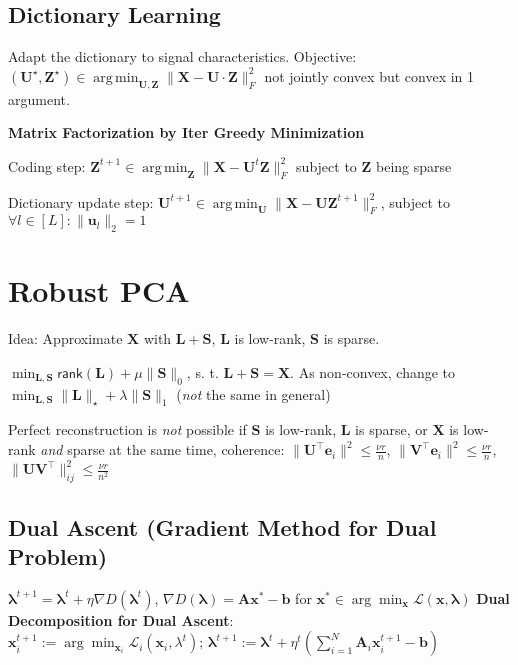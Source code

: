 \documentclass[a4paper, 11pt, landscape]{article}
\DeclareMathOperator*{\argmin}{arg\,min}
\begin{document}
\begin{multicols*}{3}
\subsection{Dictionary Learning}
Adapt the dictionary to signal characteristics. Objective: $(\mathbf{U}^\star, \mathbf{Z}^\star) \in \argmin_\mathbf{U,Z} \| \mathbf{X} - \mathbf{U} \cdot \mathbf{Z} \|_F^2$ not jointly convex but convex in 1 argument.

\textbf{Matrix Factorization by Iter Greedy Minimization}
\begin{inparaenum}
  \item Coding step: $\mathbf{Z}^{t+1} \in \argmin_\mathbf{Z} \| \mathbf{X} - \mathbf{U}^t \mathbf{Z} \|_F^2$ subject to $\mathbf{Z}$ being sparse
  \item Dictionary update step: $\mathbf{U}^{t+1} \in \argmin_\mathbf{U} \| \mathbf{X} - \mathbf{UZ}^{t+1} \|_F^2$, subject to $\forall l\in [L]:\|\mathbf{u}_l\|_2 = 1$
\end{inparaenum}

\section{Robust PCA}
\begin{compactitem}
	\item Idea: Approximate $\mathbf{X}$ with $\mathbf{L} + \mathbf{S}$, $\mathbf{L}$ is low-rank, $\mathbf{S}$ is sparse.
	\item $\min_{\mathbf{L},\mathbf{S}}\mathsf{rank}(\mathbf{L}) + \mu \lVert \mathbf{S}\rVert_0$, s. t. $\mathbf{L} + \mathbf{S} = \mathbf{X}$. As non-convex, change to $\min_{\mathbf{L},\mathbf{S}} \|\mathbf{L}\|_\star + \lambda \lVert\mathbf{S}\rVert_1$ (\emph{not} the same in general)
	\item Perfect reconstruction is \emph{not} possible if $\mathbf{S}$ is low-rank, $\mathbf{L}$ is sparse, or $\mathbf{X}$ is low-rank \textit{and} sparse at the same time, coherence: $\|\mathbf{U}^\top \mathbf{e}_i\|^2 \leq \frac{\nu r}{n}$, $\|\mathbf{V}^\top \mathbf{e}_i\|^2 \leq \frac{\nu r}{n}$, $\|\mathbf{UV}^\top\|^2_{ij} \leq \frac{\nu r}{n^2}$
\end{compactitem}

\subsection{Dual Ascent (Gradient Method for Dual Problem)}
$\boldsymbol{\lambda}^{t+1} = \boldsymbol{\lambda}^{t} + \eta \nabla D(\boldsymbol{\lambda}^t)$,
$ \nabla D (\boldsymbol{\lambda}) = \mathbf{A}\mathbf{x}^*-\mathbf{b}$ for $\mathbf{x}^* \in \arg\min_\mathbf{x} \mathcal{L}(\mathbf{x},\boldsymbol{\lambda})$
\textbf{Dual Decomposition for Dual Ascent}: 
\\$\mathbf{x}_i^{t+1} := \arg\min_{\mathbf{x}_i} \mathcal{L}_i(\mathbf{x}_i,\lambda^t)$; 
$\boldsymbol{\lambda}^{t+1} := \boldsymbol{\lambda}^t + \eta^t \left( \sum_{i=1}^{N} \mathbf{A}_i \mathbf{x}_i^{t+1} -\mathbf{b} \right) $


\end{multicols*}
\end{document}
